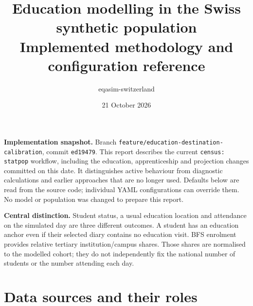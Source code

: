 \documentclass[11pt,a4paper]{article}
\title{Education modelling in the Swiss synthetic population\\
\large Implemented methodology and configuration reference}
\author{eqasim-switzerland}
\date{21 October 2026}
\newcommand{\code}[1]{\nolinkurl{#1}}
\begin{document}
\maketitle

\textbf{Implementation snapshot.} Branch
\code{feature/education-destination-calibration}, commit \code{ed19479}.
This report describes the current \code{census: statpop} workflow, including
the education, apprenticeship and projection changes committed on this date.
It distinguishes active behaviour from diagnostic calculations and earlier
approaches that are no longer used. Defaults below are read from the source
code; individual YAML configurations can override them. No model or population
was changed to prepare this report.

\textbf{Central distinction.} Student status, a usual education location and
attendance on the simulated day are three different outcomes. A student has an
education anchor even if their selected diary contains no education visit.
BFS enrolment provides relative tertiary institution/campus shares. Those
shares are normalised to the modelled cohort; they do not independently fix
the national number of students or the number attending each day.

\tableofcontents
\newpage

\section{Data sources and their roles}
\end{document}
